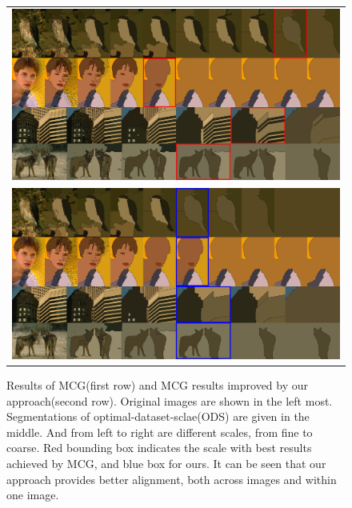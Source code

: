 \begin{figure}[tb]
\begin{center}
\begin{tabular}{c}
\includegraphics[width=17cm]{fig/vis/stack_1.png} \\
\includegraphics[width=17cm]{fig/vis/stack_2.png}
\end{tabular}
\end{center}
\caption{Results of MCG(first row) and MCG results improved by our approach(second row). Original images are shown in the left most. Segmentations of optimal-dataset-sclae(ODS) are given in the middle. And from left to right are different scales, from fine to coarse. Red bounding box indicates the scale with best results achieved by MCG, and blue box for ours. It can be seen that our approach provides better alignment, both across images and within one image. }
\label{fig:mcg_vis2}
\end{figure}


